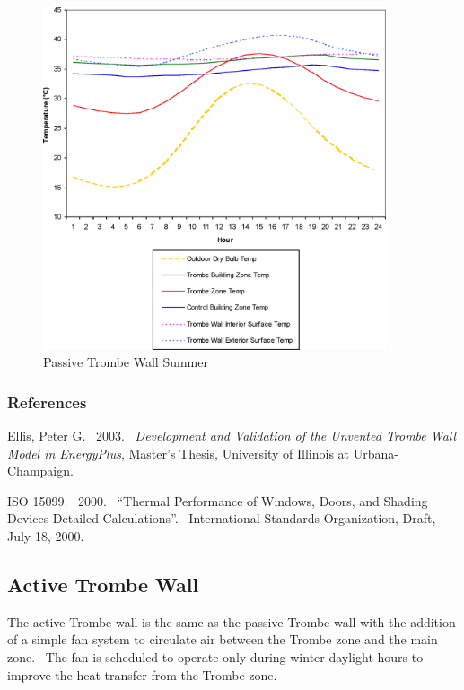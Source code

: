 \begin{figure}[hbtp] %
\centering
\includegraphics[width=0.9\textwidth, height=0.9\textheight, keepaspectratio=true]{media/image6832.png}
\caption{Passive Trombe Wall Summer \protect \label{fig:passive-trombe-wall-summer}}
\end{figure}

\subsubsection{References}\label{references-047}

Ellis, Peter G.~ 2003.~ \emph{Development and Validation of the Unvented Trombe Wall Model in EnergyPlus}, Master's Thesis, University of Illinois at Urbana-Champaign.

ISO 15099.~ 2000.~ ``Thermal Performance of Windows, Doors, and Shading Devices-Detailed Calculations''.~ International Standards Organization, Draft, July 18, 2000.

\subsection{Active Trombe Wall}\label{active-trombe-wall}

The active Trombe wall is the same as the passive Trombe wall with the addition of a simple fan system to circulate air between the Trombe zone and the main zone.~ The fan is scheduled to operate only during winter daylight hours to improve the heat transfer from the Trombe zone.

